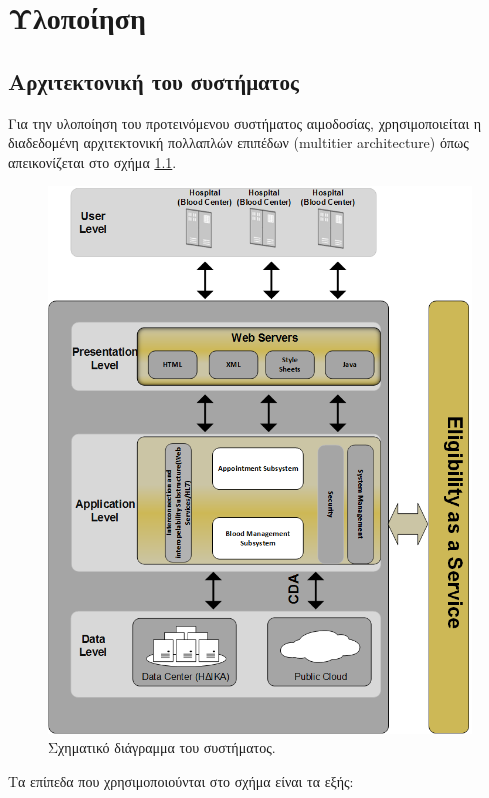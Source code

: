 \graphicspath{ {Figures/implementation/} }

\chapter{Υλοποίηση}\label{ch:Implementation}

\section{Αρχιτεκτονική του συστήματος}
Για την υλοποίηση του προτεινόμενου συστήματος αιμοδοσίας, χρησιμοποιείται η διαδεδομένη αρχιτεκτονική πολλαπλών επιπέδων (multitier architecture) όπως απεικονίζεται στο σχήμα \ref{fig:architect_schema}.

	\begin{figure}[H]
	    \centering
	    \includegraphics[width=1\textwidth]{architecture.png}
	    \caption{ Σχηματικό διάγραμμα του συστήματος. }
	    \label{fig:architect_schema}
	\end{figure}
	Τα επίπεδα που χρησιμοποιούνται στο σχήμα είναι τα εξής:

